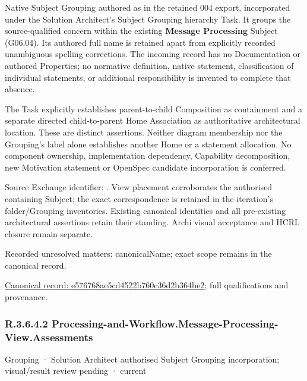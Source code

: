 Native Subject Grouping authored as \texttt{} in the retained 004 export,
incorporated under the Solution Architect's Subject Grouping hierarchy Task.
It groups the source-qualified \texttt{} concern within
the existing \textbf{Message Processing} Subject (G06.04). Its authored full name
is retained apart from explicitly recorded unambiguous spelling corrections.
The incoming record has no Documentation or authored Properties; no normative
definition, native statement, classification of individual statements, or
additional responsibility is invented to complete that absence.



The Task explicitly establishes parent-to-child Composition as containment and
a separate directed child-to-parent Home Association as authoritative architectural
location. These are distinct assertions. Neither diagram membership nor the
Grouping's label alone establishes another Home or a statement allocation.
No component ownership, implementation dependency, Capability decomposition,
new Motivation statement or OpenSpec candidate incorporation is conferred.



Source Exchange identifier: \texttt{}. View placement corroborates
the authorised containing Subject; the exact correspondence is retained in the
iteration's folder/Grouping inventories. Existing canonical identities and all
pre-existing architectural assertions retain their standing. Archi visual
acceptance and HCRL closure remain separate.


{\small Recorded unresolved matters: canonicalName; exact scope remains in the canonical record.}\par
{\footnotesize \href{../../../../continuum/grouping/e576768ae5cd4522b760c36d2b364be2.md}{Canonical record: e576768ae5cd4522b760c36d2b364be2}; full qualifications and provenance.}\par
\subsubsection*{R.3.6.4.2 Processing-and-Workflow.Message-Processing-View.Assessments}
\label{navigation:R.3.6.4.2}

\label{element:549eaf0604764c01814641872404017f}
{\small Grouping · Solution Architect authorised Subject Grouping incorporation; visual/result review pending · current}\par


